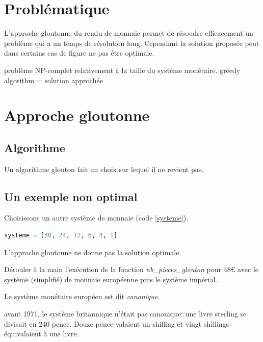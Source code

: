 \documentclass[a4paper,11pt]{article}
\begin{document}
\section{Problématique}
L'approche gloutonne du rendu de monnaie permet de résoudre efficacement un problème qui a un temps de résolution long. Cependant la solution proposée peut dans certains cas de figure ne pas être optimale.
\begin{commentprof}
    problème NP-complet relativement à la taille du système monétaire. greedy algorithm = solution approchée
\end{commentprof}
\begin{center}
\end{center}
\section{Approche gloutonne}
\subsection{Algorithme}
Un algorithme glouton fait un choix sur lequel il ne revient pas.
\begin{center}
    
    \label{glouton}
\end{center}

\subsection{Un exemple non optimal}
Choisissons un autre système de monnaie (code \ref{systeme}).
\begin{center}
    \begin{lstlisting}[language=Python]
    systeme = [30, 24, 12, 6, 3, 1]
    \end{lstlisting}
    \label{systeme}
\end{center}
L'approche gloutonne ne donne pas la solution optimale.
\begin{activite}
    Dérouler à la main l'exécution de la fonction \emph{nb\_pieces\_glouton} pour 48€ avec le système (simplifié) de monnaie européenne puis le système impérial.
\end{activite}
\begin{aretenir}[Remarque]
    Le système monétaire européen est dit \emph{canonique}.
\end{aretenir}
\begin{commentprof}
    avant 1971, le système britannique n'était pas canonique: une livre sterling se divisait en 240 pence. Douze pence valaient un shilling et vingt shillings équivalaient à une livre.
\end{commentprof}
\end{document}
